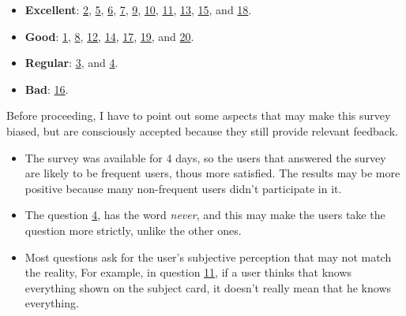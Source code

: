 \begin{itemize}
    \item \textbf{Excellent}: 
        \hyperref[fig:question-plot-2]{2}, 
        \hyperref[fig:question-plot-5]{5}, 
        \hyperref[fig:question-plot-6]{6}, 
        \hyperref[fig:question-plot-7]{7}, 
        \hyperref[fig:question-plot-9]{9}, 
        \hyperref[fig:question-plot-10]{10}, 
        \hyperref[fig:question-plot-11]{11}, 
        \hyperref[fig:question-plot-13]{13}, 
        \hyperref[fig:question-plot-15]{15}, and
        \hyperref[fig:question-plot-18]{18}.
    \item \textbf{Good}: 
        \hyperref[fig:question-plot-1]{1}, 
        \hyperref[fig:question-plot-8]{8}, 
        \hyperref[fig:question-plot-12]{12}, 
        \hyperref[fig:question-plot-14]{14}, 
        \hyperref[fig:question-plot-17]{17}, 
        \hyperref[fig:question-plot-19]{19}, and 
        \hyperref[fig:question-plot-20]{20}.
    \item \textbf{Regular}:
        \hyperref[fig:question-plot-3]{3}, and 
        \hyperref[fig:question-plot-4]{4}.
    \item \textbf{Bad}: 
        \hyperref[fig:question-plot-16]{16}.
\end{itemize}

\noindent
Before proceeding, I have to point out some aspects that may make this survey biased, but are consciously accepted because they still provide relevant feedback. 
\begin{itemize}[noitemsep]
    \item The survey was available for 4 days, so the users that answered the survey are likely to be frequent users, thous more satisfied. The results may be more positive because many non-frequent users didn't participate in it.
    \item The question \hyperref[fig:question-plot-4]{4}, has the word \textit{never}, and this may make the users take the question more strictly, unlike the other ones.
    \item Most questions ask for the user's subjective perception that may not match the reality, For example, in question \hyperref[fig:question-plot-11]{11}, if a user thinks that knows everything shown on the subject card, it doesn't really mean that he knows everything.
\end{itemize}

